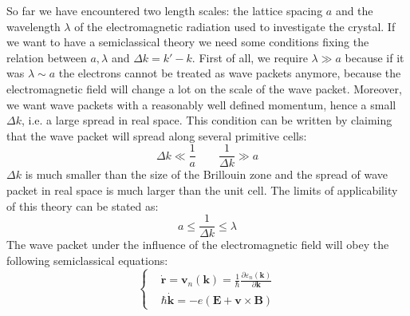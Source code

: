 \documentclass[10.75pt,a4paper,openright,bottom=2cm]{article}
\renewcommand{\Vec}[1]{\boldsymbol{#1}}
\begin{document}
So far we have encountered two length scales: the lattice spacing $a$ and the wavelength $\lambda$ of the electromagnetic radiation used to investigate the crystal. If we want to have a semiclassical theory we need some conditions fixing the relation between $a, \lambda$ and $\Delta k=k'-k$. First of all, we require $\lambda\gg a$ because if it was $\lambda\sim a$ the electrons cannot be treated as wave packets anymore, because the electromagnetic field will change a lot on the scale of the wave packet. Moreover, we want wave packets with a reasonably well defined momentum, hence a small $\Delta k$, i.e. a large spread in real space. This condition can be written by claiming that the wave packet will spread along several primitive cells:
\[
\Delta k\ll\frac{1}{a} \qquad \frac{1}{\Delta k}\gg a
\]
$\Delta k$ is much smaller than the size of the Brillouin zone and the spread of wave packet in real space is much larger than the unit cell. The limits of applicability of this theory can be stated as:
\[
a\le\frac{1}{\Delta k}\le\lambda
\]
The wave packet under the influence of the electromagnetic field will obey the following semiclassical equations:
\begin{equation}
\label{eqmot}
\left\{
\begin{aligned}
&\Dot{\Vec{r}}=\Vec{v}_n(\Vec{k})=\frac{1}{\hbar}\frac{\partial \varepsilon_n(\Vec{k})}{\partial\Vec{k}}\\
&\hbar\Vec{\Dot{k}}=-e(\Vec{E}+\Vec{v}\times\Vec{B}) %
\end{aligned}
\right.
\end{equation}
\end{document}

